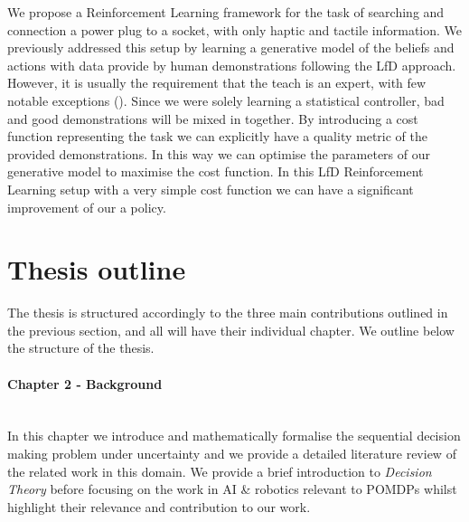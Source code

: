 We propose a Reinforcement Learning framework for the task of searching and connection a power plug to a socket, with only haptic 
and tactile information. We previously addressed this setup by learning a generative model of the beliefs and actions with data 
provide by human demonstrations following the LfD approach. However, it is usually the requirement that 
the teach is an expert, with few notable exceptions (\cite{rai2013learning}). Since we were solely learning a 
statistical controller, bad and good demonstrations will be mixed in together. By introducing a cost function 
representing the task we can explicitly have a quality metric of the provided demonstrations. In this way 
we can optimise the parameters of our generative model to maximise the cost function. In this LfD Reinforcement 
Learning setup with a very simple cost function we can have a significant improvement of our a policy.

\section{Thesis outline}

The thesis is structured accordingly to the three main contributions outlined in the previous section, 
and all will have their individual chapter. We outline below the structure of the thesis.

\begin{minipage}[c]{0.9\textwidth}
\paragraph{Chapter 2 - Background}\\
In this chapter we introduce and mathematically formalise the sequential decision making problem 
under uncertainty and we provide a detailed literature review of the related work in this domain.
We provide a brief introduction to \textit{Decision Theory} before focusing on the work 
in AI \& robotics relevant to POMDPs whilst highlight their relevance and contribution to our work. 
\end{minipage}

